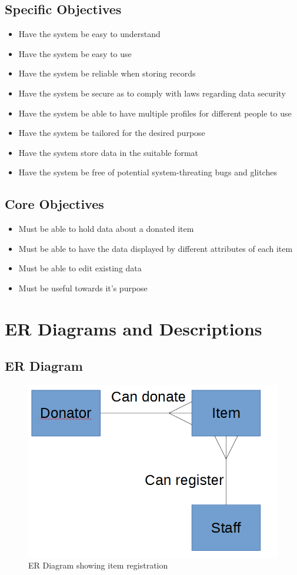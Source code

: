 \subsection{Specific Objectives}
\begin{itemize}
    \item Have the system be easy to understand
    \item Have the system be easy to use
    \item Have the system be reliable when storing records
	\item Have the system be secure as to comply with laws regarding data security
	\item Have the system be able to have multiple profiles for different people to use
	\item Have the system be tailored for the desired purpose
	\item Have the system store data in the suitable format
	\item Have the system be free of potential system-threating bugs and glitches
\end{itemize}
\subsection{Core Objectives}
\begin{itemize}
    \item Must be able to hold data about a donated item
    \item Must be able to have the data displayed by different attributes of each item
    \item Must be able to edit existing data
	\item Must be useful towards it's purpose
\end{itemize}

\section{ER Diagrams and Descriptions}

\subsection{ER Diagram}
\begin{figure}[H]
    \includegraphics[width=\textwidth]{./Analysis/ERDiagram.png}
    \caption{ER Diagram showing item registration} \label{fig:ER Diagram}
\end{figure}
